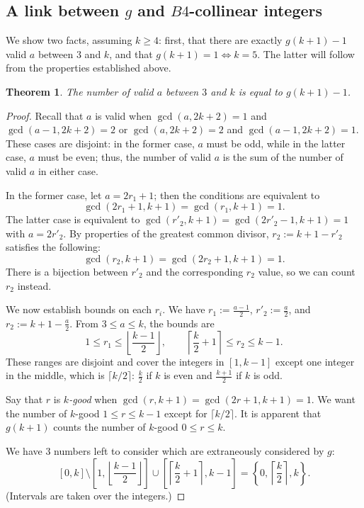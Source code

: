 \documentclass{article}
\theoremstyle{mydefstyle}
\newtheorem{theorem}{Theorem}
\begin{document}
\subsection{A link between $g$ and $B4$-collinear integers}

We show two facts, assuming $k\ge4$: first, that there are exactly $g(k+1)-1$ valid $a$ between $3$ and $k$, and that $g(k+1)=1\iff k=5$. The latter will follow from the properties established above. 

\begin{theorem}
\label{former:label}
The number of valid $a$ between $3$ and $k$ is equal to $g(k+1)-1$. 
\end{theorem}

\begin{proof}
Recall that $a$ is valid when $\gcd(a,2k+2)=1$ and $\gcd(a-1,2k+2)=2$ or $\gcd(a,2k+2)=2$ and $\gcd(a-1,2k+2)=1$. These cases are disjoint: in the former case, $a$ must be odd, while in the latter case, $a$ must be even; thus, the number of valid $a$ is the sum of the number of valid $a$ in either case. 

In the former case, let $a=2r_1+1$; then the conditions are equivalent to \[\gcd(2r_1+1,k+1)=\gcd(r_1,k+1)=1.\] The latter case is equivalent to $\gcd(r'_2,k+1)=\gcd(2r'_2-1,k+1)=1$ with $a=2r'_2$. By properties of the greatest common divisor, $r_2:=k+1-r'_2$ satisfies the following: \[\gcd(r_2,k+1)=\gcd(2r_2+1,k+1)=1.\] There is a bijection between $r'_2$ and the corresponding $r_2$ value, so we can count $r_2$ instead. 

We now establish bounds on each $r_i$. We have $r_1:=\frac{a-1}2$, $r'_2:=\frac a2$, and $r_2:=k+1-\frac a2$. From $3\le a\le k$, the bounds are \[1\le r_1\le\left\lfloor\frac{k-1}2\right\rfloor,\qquad\left\lceil\frac k2+1\right\rceil\le r_2\le k-1.\] These ranges are disjoint and cover the integers in $[1,k-1]$ except one integer in the middle, which is $\lceil k/2\rceil$: $\frac k2$ if $k$ is even and $\frac{k+1}2$ if $k$ is odd. 

Say that $r$ is \textit{$k$-good} when $\gcd(r,k+1)=\gcd(2r+1,k+1)=1$. We want the number of $k$-good $1\le r\le k-1$ except for $\lceil k/2\rceil$. It is apparent that $g(k+1)$ counts the number of $k$-good $0\le r\le k$. 

We have $3$ numbers left to consider which are extraneously considered by $g$: \[[0,k]\setminus\left[1,\left\lfloor\frac{k-1}2\right\rfloor\right]\cup\left[\left\lceil\frac k2+1\right\rceil,k-1\right]=\left\{0,\left\lceil\frac k2\right\rceil,k\right\}.\] (Intervals are taken over the integers.) 


\end{proof}
\end{document}
